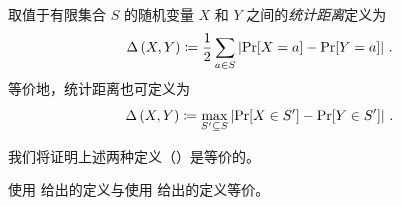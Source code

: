 \documentclass[american,singlepageview]{snargs-book-zh}
\renewcommand{\enspace}{\ensuremath{\thinspace}}
\newcommand{\DefineEqual}{\coloneqq}
\newcommand{\RandomVariableX}{X}
\newcommand{\RandomVariableY}{Y}
\newcommand{\RandomVariableSupport}{S}
\newcommand{\StatisticalDistanceSymbol}{\Delta}
\newcommand{\StatisticalDistance}[2]{\StatisticalDistanceSymbol\left(#1,#2\right)}
\newcommand{\AbsValue}[1]{\left|{#1}\right|}
\begin{document}
\begin{definition}
\label{definition:statistical-distance}
取值于有限集合 $\RandomVariableSupport$ 的随机变量 $\RandomVariableX$ 和 $\RandomVariableY$ 之间的\emph{统计距离}定义为
\begin{equation}
\label{definition:statistical-distance-def1}
\StatisticalDistance{\RandomVariableX}{\RandomVariableY}
\DefineEqual
\frac{1}{2} \sum_{a \in \RandomVariableSupport} \AbsValue{\Pr[\RandomVariableX=a]-\Pr[\RandomVariableY=a]}
\enspace.
\end{equation}
等价地，统计距离也可定义为
\begin{equation}
\label{definition:statistical-distance-def2}
\StatisticalDistance{\RandomVariableX}{\RandomVariableY}
\DefineEqual
\max_{\RandomVariableSupport' \subseteq \RandomVariableSupport} \AbsValue{\Pr[\RandomVariableX \in \RandomVariableSupport']-\Pr[\RandomVariableY \in \RandomVariableSupport']}
\enspace.
\end{equation}
\end{definition}

我们将证明上述两种定义（）是等价的。

\begin{claim}
使用  给出的定义与使用  给出的定义等价。
\end{claim}
\end{document}
